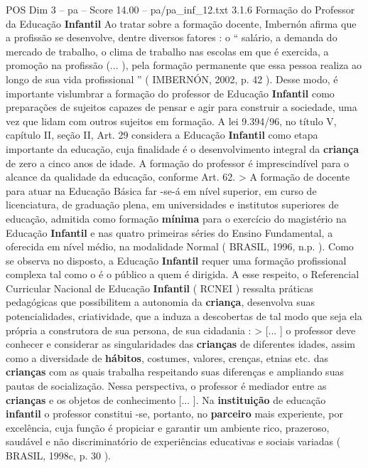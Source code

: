 \begin{textsample}{POS Dim 3 – pa – Score 14.00 – pa/pa\_inf\_12.txt}  \label{ex:f3_pos_239}
3.1.6 Formação do Professor da Educação \textbf{Infantil} Ao tratar sobre a formação docente, Imbernón afirma que a profissão se desenvolve, dentre diversos fatores : o “ salário, a demanda do mercado de trabalho, o clima de trabalho nas escolas em que é exercida, a promoção na profissão (... ), pela formação permanente que essa pessoa realiza ao longo de sua vida profissional ” ( IMBERNÓN, 2002, p. 42 ).
Desse modo, é importante vislumbrar a formação do professor de Educação \textbf{Infantil} como preparações de sujeitos capazes de pensar e agir para construir a sociedade, uma vez que lidam com outros sujeitos em formação.
A lei 9.394/96, no título V, capítulo II, seção II, Art. 29 considera a Educação \textbf{Infantil} como etapa importante da educação, cuja finalidade é o desenvolvimento integral da \textbf{criança} de zero a cinco anos de idade.
A formação do professor é imprescindível para o alcance da qualidade da educação, conforme Art. 62. > A formação de docente para atuar na Educação Básica far -se-á em nível superior, em curso de licenciatura, de graduação plena, em universidades e institutos superiores de educação, admitida como formação \textbf{mínima} para o exercício do magistério na Educação \textbf{Infantil} e nas quatro primeiras séries do Ensino Fundamental, a oferecida em nível médio, na modalidade Normal ( BRASIL, 1996, n.p. ).
Como se observa no disposto, a Educação \textbf{Infantil} requer uma formação profissional complexa tal como o é o público a quem é dirigida.
A esse respeito, o Referencial Curricular Nacional de Educação \textbf{Infantil} ( RCNEI ) ressalta práticas pedagógicas que possibilitem a autonomia da \textbf{criança}, desenvolva suas potencialidades, criatividade, que a induza a descobertas de tal modo que seja ela própria a construtora de sua persona, de sua cidadania : > [... ] o professor deve conhecer e considerar as singularidades das \textbf{crianças} de diferentes idades, assim como a diversidade de \textbf{hábitos}, costumes, valores, crenças, etnias etc. das \textbf{crianças} com as quais trabalha respeitando suas diferenças e ampliando suas pautas de socialização.
Nessa perspectiva, o professor é mediador entre as \textbf{crianças} e os objetos de conhecimento [... ].
Na \textbf{instituição} de educação \textbf{infantil} o professor constitui -se, portanto, no \textbf{parceiro} mais experiente, por excelência, cuja função é propiciar e garantir um ambiente rico, prazeroso, saudável e não discriminatório de experiências educativas e sociais variadas ( BRASIL, 1998c, p. 30 ).

\end{textsample}
